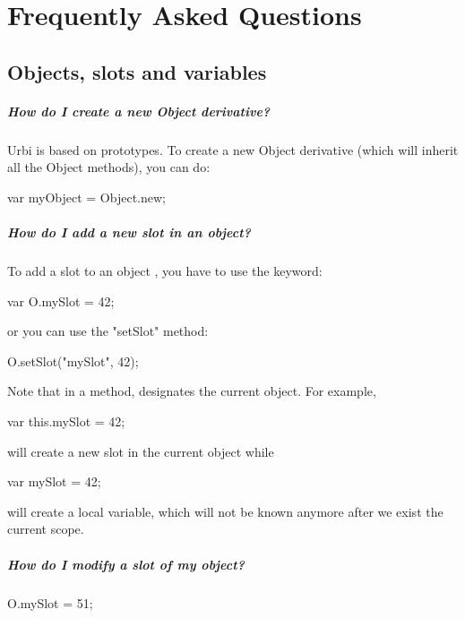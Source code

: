 \chapter{Frequently Asked Questions}
\label{sec:faq}

\section{Objects, slots and variables}

\paragraph{How do I create a new Object derivative?}
Urbi is based on prototypes. To create a new Object derivative (which
will inherit all the Object methods), you can do:

\begin{urbifixme}
var myObject = Object.new;
\end{urbifixme}

\paragraph{How do I add a new slot in an object?}
To add a slot to an object , you have to use the  keyword:

\begin{urbifixme}
var O.mySlot = 42;
\end{urbifixme}

\noindent
or you can use the "setSlot" method:

\begin{urbifixme}
O.setSlot("mySlot", 42);
\end{urbifixme}

Note that in a method,  designates the current object. For example,

\begin{urbifixme}
var this.mySlot = 42;
\end{urbifixme}

\noindent
will create a new slot in the current object while

\begin{urbifixme}
var mySlot = 42;
\end{urbifixme}

\noindent
will create a local variable, which will not be known anymore after we
exist the current scope.

\paragraph{How do I modify a slot of my object?}
\begin{urbifixme}
O.mySlot = 51;
\end{urbifixme}

